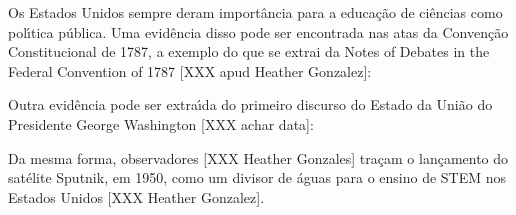 \documentclass[
12pt,		%
openright,	%
twoside,  %
a4paper,			%
chapter=TITLE,		%
english,			%
french,				%
spanish,			%
brazil				%
]{USPSC-classe/USPSC}
\begin{document}
Os Estados Unidos sempre deram import\^ancia para a educa\c{c}\~ao de ci\^encias como pol\'{\i}tica p\'ublica. Uma evid\^encia disso pode ser encontrada nas atas da Conven\c{c}\~ao Constitucional de 1787, a exemplo do que se extrai da \textquotedbl Notes of Debates in the Federal Convention of 1787 [XXX apud Heather Gonzalez]:


















\noindent\begin{center}\mbox{\centering{}}\end{center}


Outra evid\^encia pode ser extra\'{\i}da do primeiro discurso do Estado da Uni\~ao do Presidente George Washington [XXX achar data]:


















\noindent\begin{center}\mbox{\centering{}}\end{center}


Da mesma forma, observadores [XXX Heather Gonzales] tra\c{c}am o lan\c{c}amento do sat\'elite Sputnik, em 1950, como um divisor de \'aguas para o ensino de STEM nos Estados Unidos [XXX Heather Gonzalez].
\end{document}
